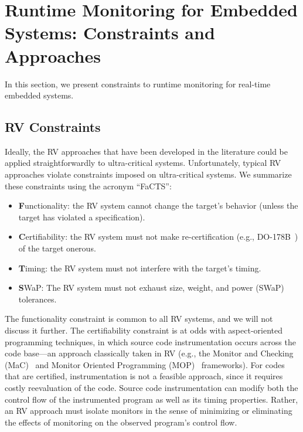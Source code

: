 \section{Runtime Monitoring for Embedded Systems: Constraints and Approaches}
\label{sec:constraintsApproaches}
In this section, we  present constraints to runtime monitoring for
real-time embedded systems. 

\subsection{RV Constraints}\label{sec:constraints}

Ideally, the RV approaches that have been developed in the literature could be
applied straightforwardly to ultra-critical systems.  Unfortunately,
typical RV approaches violate constraints imposed on ultra-critical
systems. We summarize these
constraints using the acronym ``FaCTS'':

\begin{itemize}
\item {\bf F}unctionality: the RV system cannot change the target's behavior (unless the
  target has violated a specification).
\item {\bf C}ertifiability: the RV system must not make re-certification (e.g.,
  DO-178B~\cite{DO178B}) of the target onerous.
\item {\bf T}iming: the RV system must not interfere with the target's timing.
\item {\bf S}WaP: The RV system must not exhaust size, weight, and power (SWaP)
  tolerances.
\end{itemize}

The functionality constraint is common to all RV systems, and we will not
discuss it further.  The certifiability constraint is at odds with
aspect-oriented programming techniques, in which source code instrumentation
occurs across the code base---an approach classically taken in RV (e.g., the
Monitor and Checking (MaC)~\cite{KimVBKLS99} and Monitor Oriented Programming
(MOP)~\cite{ChenR05} frameworks).  For codes that are certified, instrumentation
is not a feasible approach, since it requires costly reevaluation of the code.
Source code instrumentation can modify both the control flow of the instrumented
program as well as its timing properties.  Rather, an RV approach must isolate
monitors in the sense of minimizing or eliminating the effects of monitoring on
the observed program's control flow.

